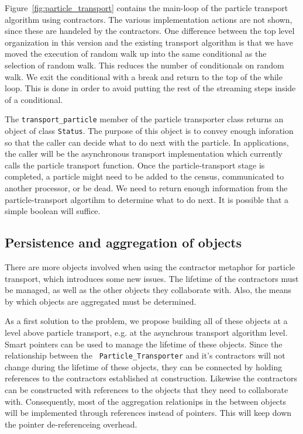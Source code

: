 \documentclass[memo]{ResearchNote}
\begin{document}
Figure~\ref{fig:particle_transport} contains the main-loop of the
particle transport algorithm using contractors. The various
implementation actions are not shown, since these are handeled by the
contractors. One difference between the top level organization in this
version and the existing transport algorithm is that we have moved the
execution of random walk up into the same conditional as the selection
of random walk. This reduces the number of conditionals on random
walk. We exit the conditional with a break and return to the top of
the while loop. This is done in order to avoid putting the rest of the
streaming steps inside of a conditional.

The {\tt transport\_particle} member of the particle transporter class
returns an object of class {\tt Status}. The purpose of this object is
to convey enough inforation so that the caller can decide what to do
next with the particle. In applications, the caller will be the
asynchronous transport implementation which currently calls the
particle transport function. Once the particle-transport stage is
completed, a particle might need to be added to the census,
communicated to another processor, or be dead. We need to return
enough information from the particle-transport algortihm to determine
what to do next. It is possible that a simple boolean will suffice.

\subsection{Persistence and aggregation of objects}

There are more objects involved when using the contractor metaphor for
particle transport, which introduces some new issues. The lifetime of
the contractors must be managed, as well as the other objects they
collaborate with. Also, the means by which objects are aggregated must
be determined.

As a first solution to the problem, we propose building all of these
objects at a level above particle transport, e.g. at the asynchrous
transport algorithm level. Smart pointers can be used to manage the
lifetime of these objects. Since the relationship between the {\tt
  Particle\_Transporter} and it's contractors will not change during
the lifetime of these objects, they can be connected by holding
references to the contractors established at construction. Likewise
the contractors can be constructed with references to the objects that
they need to collaborate with. Consequently, most of the aggregation
relationips in the between objects will be implemented through
references instead of pointers. This will keep down the pointer
de-referenceing overhead.
\end{document}
